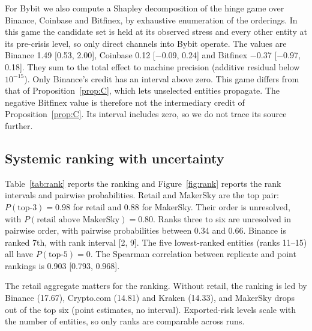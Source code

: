\documentclass[referee,pdflatex,sn-mathphys-ay]{sn-jnl}
\theoremstyle{thmstyleone}%
\theoremstyle{thmstyletwo}%
\theoremstyle{thmstylethree}%
\begin{document}
For Bybit we also compute a Shapley decomposition of the hinge game over Binance, Coinbase and Bitfinex, by exhaustive
enumeration of the orderings. In this game the candidate set is held at its observed stress and every other entity at its
pre-crisis level, so only direct channels into Bybit operate. The values are Binance 1.49 [0.53, 2.00],
Coinbase 0.12 [$-$0.09, 0.24] and Bitfinex $-$0.37 [$-$0.97, 0.18]. They sum to the
total effect to machine precision (additive residual below $10^{-15}$). Only Binance's credit has an interval above zero.
This game differs from that of Proposition~\ref{prop:C}, which lets unselected entities propagate. The negative Bitfinex
value is therefore not the intermediary credit of Proposition~\ref{prop:C}. Its interval includes zero, so we do not trace
its source further.

\subsection{Systemic ranking with uncertainty}
\label{subsec:ranking}
Table~\ref{tab:rank} reports the ranking and Figure~\ref{fig:rank} reports the rank intervals and pairwise probabilities.
Retail and MakerSky are the top pair: $P(\text{top-3})=0.98$ for retail and $0.88$ for MakerSky. Their
order is unresolved, with $P(\text{retail above MakerSky})=0.80$. Ranks three to six are unresolved in
pairwise order, with pairwise probabilities between 0.34 and 0.66. Binance is ranked 7th, with rank interval [2, 9]. The five
lowest-ranked entities (ranks 11--15) all have $P(\text{top-5})=0$. The Spearman correlation between replicate and
point rankings is 0.903 [0.793, 0.968].

The retail aggregate matters for the ranking. Without retail, the ranking is led by Binance (17.67), Crypto.com
(14.81) and Kraken (14.33), and MakerSky drops out of the top six
(point estimates, no interval). Exported-risk levels scale with the number of entities, so only ranks
are comparable across runs.
\end{document}
